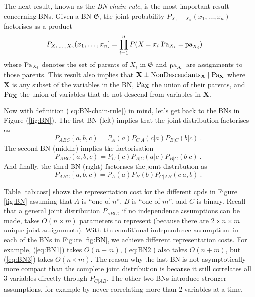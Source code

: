 The next result, known as the \emph{BN chain rule}, is the most important result concerning BNs. 
Given a BN $\mathfrak G$, the joint probability $P_{X_1, \ldots, X_n}(x_1, \ldots, x_n)$ factorises as a product
\begin{align}\label{eq:BN-chain-rule}
P_{X_1, \ldots, X_n}(x_1, \ldots, x_n) &= \prod_{i=1}^n P(X=x_i|\mathbf{\text{Pa}}_{X_i}=\mathbf{\text{pa}}_{X_i}) 
\end{align}
where $\mathbf{\text{Pa}}_{X_i}$ denotes the set of parents of $X_i$ in $\mathfrak G$ and $\mathbf{\text{pa}}_{X_i}$ are assignments to those parents. This result also implies that $\mathbf X \perp \text{NonDescendants}_{\mathbf X} \mid \mathbf{\text{Pa}}_{\mathbf X}$ where $\mathbf X$ is any subset of the variables in the BN, $\mathbf{\text{Pa}}_{\mathbf X}$ the union of their parents, and $\mathbf{\text{Pa}}_{\mathbf X}$ the union of variables that do not descend from variables in $\mathbf X$.

Now with definition (\ref{eq:BN-chain-rule}) in mind, let's get back to the BNs in Figure (\ref{fig:BN}).
The first BN (left) implies that the joint distribution factorises as 
\begin{equation}\label{eq:BN1}
P_{ABC}(a,b,c) = P_A(a)P_{C|A}(c|a)P_{B|C}(b|c) ~ .
\end{equation}
The second BN (middle) implies the factorisation 
\begin{equation}\label{eq:BN2}
P_{ABC}(a,b,c) = P_C(c)P_{A|C}(a|c)P_{B|C}(b|c) ~ .
\end{equation}	
And finally, the third BN (right) factorises the joint distribution as 
\begin{equation}\label{eq:BN3}
P_{ABC}(a,b,c) = P_A(a)P_B(b)P_{C|AB}(c|a,b) ~ .
\end{equation}

Table \ref{tab:cost} shows the representation cost for the different cpds in Figure \ref{fig:BN} assuming that $A$ is ``one of $n$'', $B$ is ``one of $m$'', and $C$ is binary.
Recall that a general joint distribution $P_{ABC}$, if no independence assumptions can be made, takes $O(n \times m)$ parameters to represent (because there are $2 \times n \times m$ unique joint assignments). 
With the conditional independence assumptions in each of the BNs in Figure \ref{fig:BN}, we achieve different representation costs. 
For example, (\ref{eq:BN1}) takes $O(n + m)$, (\ref{eq:BN2}) also takes $O(n + m)$, but (\ref{eq:BN3}) takes $O(n \times m)$.
The reason why the last BN is not asymptotically more compact than the complete joint distribution is because it still correlates all $3$ variables directly through $P_{C|AB}$.
The other two BNs introduce stronger assumptions, for example by never correlating more than 2 variables at a time. 
	
